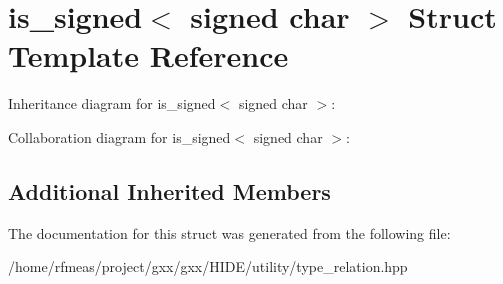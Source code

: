 \hypertarget{structis__signed_3_01signed_01char_01_4}{}\section{is\+\_\+signed$<$ signed char $>$ Struct Template Reference}
\label{structis__signed_3_01signed_01char_01_4}


Inheritance diagram for is\+\_\+signed$<$ signed char $>$\+:


Collaboration diagram for is\+\_\+signed$<$ signed char $>$\+:
\subsection*{Additional Inherited Members}


The documentation for this struct was generated from the following file\+:\begin{DoxyCompactItemize}
\item 
/home/rfmeas/project/gxx/gxx/\+H\+I\+D\+E/utility/type\+\_\+relation.\+hpp\end{DoxyCompactItemize}
